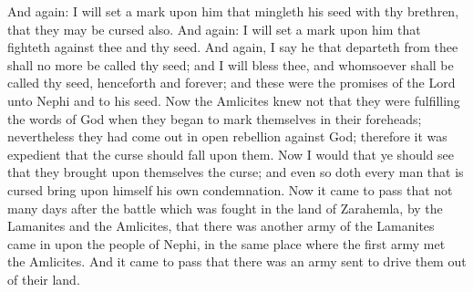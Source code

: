 \bverse \iffalse And again: I will set a mark upon him that mingleth his seed with thy brethren, that they may be cursed also. \fi
And again: I will set a mark upon him that mingleth his seed with thy brethren, that they may be cursed also.
\bverse \iffalse And again: I will set a mark upon him that fighteth against thee and thy seed. \fi
And again: I will set a mark upon him that fighteth against thee and thy seed.
\bverse \iffalse And again, I say he that departeth from thee shall no more be called thy seed; and I will bless thee, and whomsoever shall be called thy seed, henceforth and forever; and these were the promises of the Lord unto Nephi and to his seed. \fi
And again, I say he that departeth from thee shall no more be called thy seed; and I will bless thee, and whomsoever shall be called thy seed, henceforth and forever; and these were the promises of the Lord unto Nephi and to his seed.
\bverse \iffalse Now the Amlicites knew not that they were fulfilling the words of God when they began to mark themselves in their foreheads; nevertheless they had come out in open rebellion against God; therefore it was expedient that the curse should fall upon them. \fi
Now the Amlicites knew not that they were fulfilling the words of God when they began to mark themselves in their foreheads; nevertheless they had come out in open rebellion against God; therefore it was expedient that the curse should fall upon them.
\bverse \iffalse Now I would that ye should see that they brought upon themselves the curse; and even so doth every man that is cursed bring upon himself his own condemnation. \fi
Now I would that ye should see that they brought upon themselves the curse; and even so doth every man that is cursed bring upon himself his own condemnation.
\bverse \iffalse Now it came to pass that not many days after the battle which was fought in the land of Zarahemla, by the Lamanites and the Amlicites, that there was another army of the Lamanites came in upon the people of Nephi, in the same place where the first army met the Amlicites. \fi
Now it came to pass that not many days after the battle which was fought in the land of Zarahemla, by the Lamanites and the Amlicites, that there was another army of the Lamanites came in upon the people of Nephi, in the same place where the first army met the Amlicites.
\bverse \iffalse And it came to pass that there was an army sent to drive them out of their land. \fi
And it came to pass that there was an army sent to drive them out of their land.
